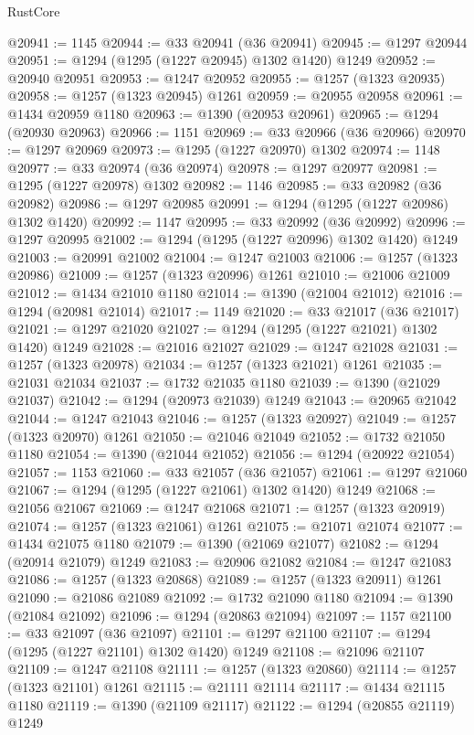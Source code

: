 \begin{lexlean}{RustCore}
\begin{coremodule}
@20941 := 1145
@20944 := @33 @20941 (@36 @20941)
@20945 := @1297 @20944
@20951 := @1294 (@1295 (@1227 @20945) @1302 @1420) @1249
@20952 := @20940 @20951
@20953 := @1247 @20952
@20955 := @1257 (@1323 @20935)
@20958 := @1257 (@1323 @20945) @1261
@20959 := @20955 @20958
@20961 := @1434 @20959 @1180
@20963 := @1390 (@20953 @20961)
@20965 := @1294 (@20930 @20963)
@20966 := 1151
@20969 := @33 @20966 (@36 @20966)
@20970 := @1297 @20969
@20973 := @1295 (@1227 @20970) @1302
@20974 := 1148
@20977 := @33 @20974 (@36 @20974)
@20978 := @1297 @20977
@20981 := @1295 (@1227 @20978) @1302
@20982 := 1146
@20985 := @33 @20982 (@36 @20982)
@20986 := @1297 @20985
@20991 := @1294 (@1295 (@1227 @20986) @1302 @1420)
@20992 := 1147
@20995 := @33 @20992 (@36 @20992)
@20996 := @1297 @20995
@21002 := @1294 (@1295 (@1227 @20996) @1302 @1420) @1249
@21003 := @20991 @21002
@21004 := @1247 @21003
@21006 := @1257 (@1323 @20986)
@21009 := @1257 (@1323 @20996) @1261
@21010 := @21006 @21009
@21012 := @1434 @21010 @1180
@21014 := @1390 (@21004 @21012)
@21016 := @1294 (@20981 @21014)
@21017 := 1149
@21020 := @33 @21017 (@36 @21017)
@21021 := @1297 @21020
@21027 := @1294 (@1295 (@1227 @21021) @1302 @1420) @1249
@21028 := @21016 @21027
@21029 := @1247 @21028
@21031 := @1257 (@1323 @20978)
@21034 := @1257 (@1323 @21021) @1261
@21035 := @21031 @21034
@21037 := @1732 @21035 @1180
@21039 := @1390 (@21029 @21037)
@21042 := @1294 (@20973 @21039) @1249
@21043 := @20965 @21042
@21044 := @1247 @21043
@21046 := @1257 (@1323 @20927)
@21049 := @1257 (@1323 @20970) @1261
@21050 := @21046 @21049
@21052 := @1732 @21050 @1180
@21054 := @1390 (@21044 @21052)
@21056 := @1294 (@20922 @21054)
@21057 := 1153
@21060 := @33 @21057 (@36 @21057)
@21061 := @1297 @21060
@21067 := @1294 (@1295 (@1227 @21061) @1302 @1420) @1249
@21068 := @21056 @21067
@21069 := @1247 @21068
@21071 := @1257 (@1323 @20919)
@21074 := @1257 (@1323 @21061) @1261
@21075 := @21071 @21074
@21077 := @1434 @21075 @1180
@21079 := @1390 (@21069 @21077)
@21082 := @1294 (@20914 @21079) @1249
@21083 := @20906 @21082
@21084 := @1247 @21083
@21086 := @1257 (@1323 @20868)
@21089 := @1257 (@1323 @20911) @1261
@21090 := @21086 @21089
@21092 := @1732 @21090 @1180
@21094 := @1390 (@21084 @21092)
@21096 := @1294 (@20863 @21094)
@21097 := 1157
@21100 := @33 @21097 (@36 @21097)
@21101 := @1297 @21100
@21107 := @1294 (@1295 (@1227 @21101) @1302 @1420) @1249
@21108 := @21096 @21107
@21109 := @1247 @21108
@21111 := @1257 (@1323 @20860)
@21114 := @1257 (@1323 @21101) @1261
@21115 := @21111 @21114
@21117 := @1434 @21115 @1180
@21119 := @1390 (@21109 @21117)
@21122 := @1294 (@20855 @21119) @1249

\end{coremodule}
\end{lexlean}
